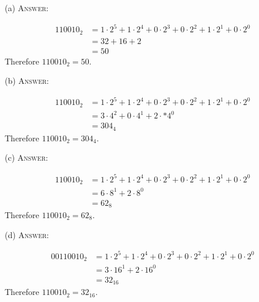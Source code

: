 (a)
\textsc{Answer:}\vspace{-2mm}
\begin{answerlong}
\begin{align*}
110010_2 &= 1 \cdot 2^{5} + 1\cdot 2^{4} + 0 \cdot 2^{3} + 0\cdot 2^{2} + 1\cdot 2^{1} + 0\cdot 2^{0} \\
         &= 32 + 16 + 2 \\
         &= 50
\end{align*}
Therefore $110010_{2} = 50$.
\end{answerlong}

(b)
\textsc{Answer:}\vspace{-2mm}
\begin{answerlong}
\begin{align*}
110010_2 &= 1 \cdot 2^{5} + 1\cdot 2^{4} + 0 \cdot 2^{3} + 0\cdot 2^{2} + 1\cdot 2^{1} + 0\cdot 2^{0} \\
         &= 3 \cdot 4^{2} + 0 \cdot 4^{1} + 2 \cdot *4^{0} \\
         &= 304_{4}
\end{align*}
Therefore $110010_{2} = 304_{4}$.
\end{answerlong}

(c)
\textsc{Answer:}\vspace{-2mm}
\begin{answerlong}
\begin{align*}
110010_2 &= 1 \cdot 2^{5} + 1\cdot 2^{4} + 0 \cdot 2^{3} + 0\cdot 2^{2} + 1\cdot 2^{1} + 0\cdot 2^{0} \\
         &=  6 \cdot 8^{1}  + 2 \cdot 8^{0}\\
         &= 62_{8}
\end{align*}
Therefore $110010_2 = 62_{8}$.
\end{answerlong}

(d)
\textsc{Answer:}\vspace{-2mm}
\begin{answerlong}
\begin{align*}
00110010_2 &= 1 \cdot 2^{5} + 1\cdot 2^{4} + 0 \cdot 2^{3} + 0\cdot 2^{2} + 1\cdot 2^{1} + 0\cdot 2^{0} \\
           &= 3 \cdot 16^{1} + 2 \cdot 16^{0}\\
           &= 32_{16}
\end{align*}
Therefore $110010_2 = 32_{16}$.
\end{answerlong}
